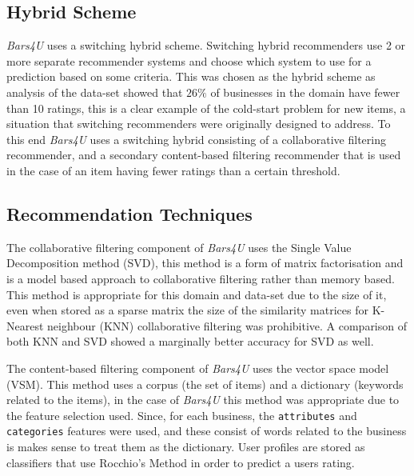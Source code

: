 \documentclass[conference]{IEEEtran}
\begin{document}
\subsection{Hybrid Scheme}
\textit{Bars4U} uses a switching hybrid scheme. Switching hybrid recommenders use 2 or more separate recommender systems and choose which system to use for a prediction based on some criteria\cite{b2}. This was chosen as the hybrid scheme as analysis of the data-set showed that $26\%$ of businesses in the domain have fewer than 10 ratings, this is a clear example of the cold-start problem for new items\cite{b2}, a situation that switching recommenders were originally designed to address\cite{b4}. To this end \textit{Bars4U} uses a switching hybrid consisting of a collaborative filtering recommender, and a secondary content-based filtering recommender that is used in the case of an item having fewer ratings than a certain threshold.
\subsection{Recommendation Techniques}
The collaborative filtering component of \textit{Bars4U} uses the Single Value Decomposition method (SVD), this method is a form of matrix factorisation and is a model based approach to collaborative filtering rather than memory based\cite{b2}. This method is appropriate for this domain and data-set due to the size of it, even when stored as a sparse matrix the size of the similarity matrices for K-Nearest neighbour (KNN) collaborative filtering was prohibitive. A comparison of both KNN and SVD showed a marginally better accuracy for SVD as well.
\par
The content-based filtering component of \textit{Bars4U} uses the vector space model (VSM)\cite{b12}. This method uses a corpus (the set of items) and a dictionary (keywords related to the items), in the case of \textit{Bars4U} this method was appropriate due to the feature selection used. Since, for each business, the \texttt{attributes} and \texttt{categories} features were used, and these consist of words related to the business is makes sense to treat them as the dictionary. User profiles are stored as classifiers that use Rocchio's Method in order to predict a users rating\cite{b13}.
\end{document}
